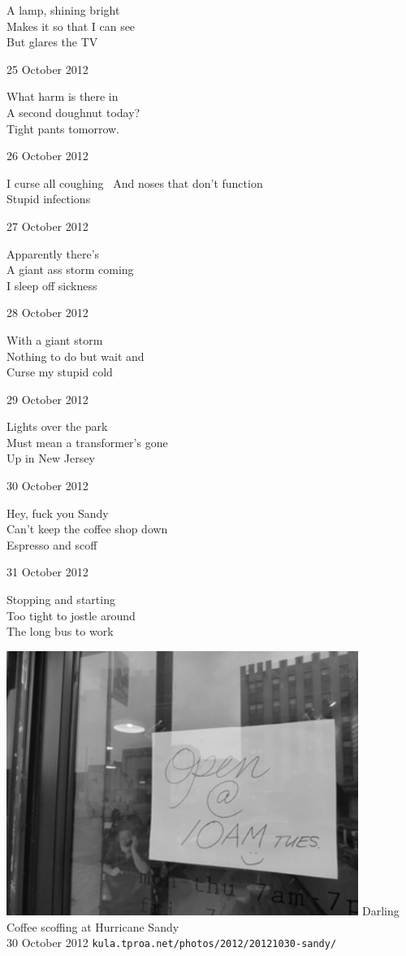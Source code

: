 \documentclass[12pt]{article}
\begin{document}
A lamp, shining bright \\
Makes it so that I can see \\
But glares the TV

\newpage

25 October 2012

What harm is there in \\
A second doughnut today? \\
Tight pants tomorrow.

26 October 2012

I curse all coughing \
And noses that don't function \\
Stupid infections

27 October 2012

Apparently there's \\
A giant ass storm coming \\
I sleep off sickness

28 October 2012

With a giant storm \\
Nothing to do but wait and \\
Curse my stupid cold

29 October 2012

Lights over the park \\
Must mean a transformer's gone \\
Up in New Jersey

30 October 2012

Hey, fuck you Sandy \\
Can't keep the coffee shop down \\
Espresso and scoff

31 October 2012

Stopping and starting \\
Too tight to jostle around \\
The long bus to work


\newpage

\begin{center}
\includegraphics[width=325pt]{darling.png}
Darling Coffee scoffing at Hurricane Sandy \\
30 October 2012
{\tt kula.tproa.net/photos/2012/20121030-sandy/ }

\end{center}
\end{document}
